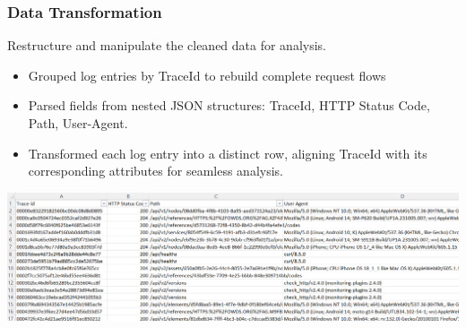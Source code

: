 \documentclass[10pt, a4paper]{beamer}
\begin{document}
	\begin{frame}
		\frametitle{Data Transformation}
		\begin{block}{}
			Restructure and manipulate the cleaned data for analysis.
			\begin{itemize}
				\item Grouped log entries by TraceId to rebuild complete request flows
				\item Parsed fields from nested JSON structures: TraceId, HTTP Status Code, Path, User-Agent.
				\item Transformed each log entry into a distinct row, aligning TraceId with its corresponding attributes for seamless analysis.
			\end{itemize}
		\end{block}
		
		\vfill
		
		\centering
		\includegraphics[width=1\textwidth]{images/DataTransformation.png} %
		
		\vskip 0.1cm %
		\centering
	\end{frame}
	
\end{document}
